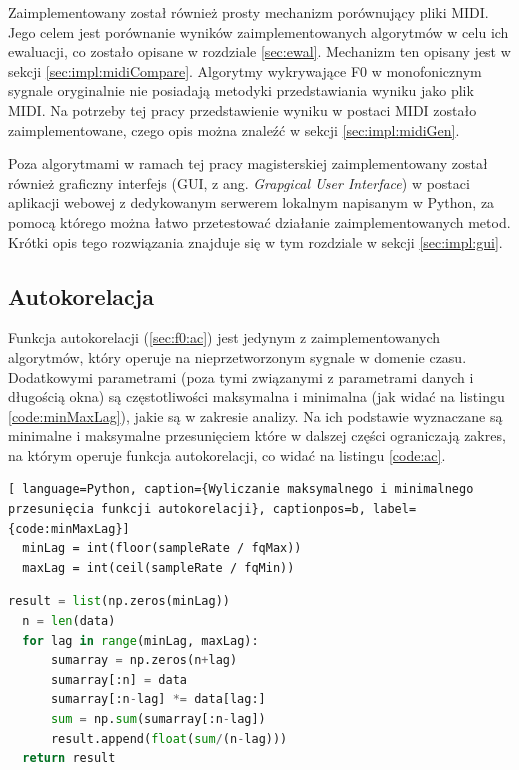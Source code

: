 \documentclass[12pt,a4paper,twoside]{mwart}
\begin{document}
Zaimplementowany został również prosty mechanizm porównujący pliki MIDI. Jego celem jest porównanie wyników zaimplementowanych algorytmów w celu ich ewaluacji, co zostało opisane w rozdziale \ref{sec:ewal}. Mechanizm ten opisany jest w sekcji \ref{sec:impl:midiCompare}. Algorytmy wykrywające F0 w monofonicznym sygnale oryginalnie nie posiadają metodyki przedstawiania wyniku jako plik MIDI. Na potrzeby tej pracy przedstawienie wyniku w postaci MIDI zostało zaimplementowane, czego opis można znaleźć w sekcji \ref{sec:impl:midiGen}.

Poza algorytmami w ramach tej pracy magisterskiej zaimplementowany został również graficzny interfejs (GUI, z ang. \textit{Grapgical User Interface}) w postaci aplikacji webowej z dedykowanym serwerem lokalnym napisanym w Python, za pomocą którego można łatwo przetestować działanie zaimplementowanych metod. Krótki opis tego rozwiązania znajduje się w tym rozdziale w sekcji \ref{sec:impl:gui}.
\subsection{Autokorelacja}\label{sec:impl:alg:ac}
Funkcja autokorelacji (\ref{sec:f0:ac}) jest jedynym z zaimplementowanych algorytmów, który operuje na nieprzetworzonym sygnale w domenie czasu. Dodatkowymi parametrami (poza tymi związanymi z parametrami danych i długością okna) są częstotliwości maksymalna i minimalna (jak widać na listingu \ref{code:minMaxLag}), jakie są w zakresie analizy. Na ich podstawie wyznaczane są minimalne i maksymalne przesunięciem które w dalszej części ograniczają zakres, na którym operuje funkcja autokorelacji, co widać na listingu \ref{code:ac}.
\begin{lstlisting}[ language=Python, caption={Wyliczanie maksymalnego i minimalnego przesunięcia funkcji autokorelacji}, captionpos=b, label={code:minMaxLag}]
  minLag = int(floor(sampleRate / fqMax))
  maxLag = int(ceil(sampleRate / fqMin))
\end{lstlisting}

\begin{lstlisting}[language=Python, caption={Funkcja autokorelacji}, captionpos=b, label={code:ac}]
  result = list(np.zeros(minLag))
  n = len(data)
  for lag in range(minLag, maxLag):
      sumarray = np.zeros(n+lag)
      sumarray[:n] = data
      sumarray[:n-lag] *= data[lag:]
      sum = np.sum(sumarray[:n-lag])
      result.append(float(sum/(n-lag)))
  return result
\end{lstlisting}
\end{document}
